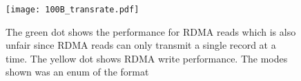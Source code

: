 \begin{figure}[t]
\texttt{[image: 100B\_transrate.pdf]}
\caption{The green dot shows the performance for RDMA reads which is also unfair
since RDMA reads can only transmit a single record at a time. The yellow dot
shows RDMA write performance. The modes shown was an enum of the format 
}
\label{fig:100B_transrate}
\end{figure}
